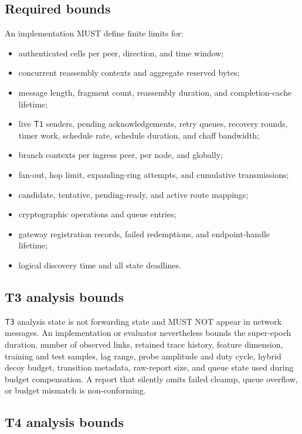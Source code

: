 \documentclass[11pt,oneside]{article}
\newcommand{\Tone}{\ensuremath{\mathsf{T1}}}
\newcommand{\Tthree}{\ensuremath{\mathsf{T3}}}
\begin{document}
\subsection{Required bounds}

An implementation MUST define finite limits for:

\begin{itemize}
  \item authenticated cells per peer, direction, and time window;
  \item concurrent reassembly contexts and aggregate reserved bytes;
  \item message length, fragment count, reassembly duration, and completion-cache lifetime;
  \item live \Tone{} senders, pending acknowledgements, retry queues, recovery rounds, timer work, schedule rate, schedule duration, and chaff bandwidth;
  \item branch contexts per ingress peer, per node, and globally;
  \item fan-out, hop limit, expanding-ring attempts, and cumulative transmissions;
  \item candidate, tentative, pending-ready, and active route mappings;
  \item cryptographic operations and queue entries;
  \item gateway registration records, failed redemptions, and endpoint-handle lifetime;
  \item logical discovery time and all state deadlines.
\end{itemize}

\subsection{T3 analysis bounds}

\Tthree{} analysis state is not forwarding state and MUST NOT appear in network messages. An implementation or evaluator nevertheless bounds the super-epoch duration, number of observed links, retained trace history, feature dimension, training and test samples, lag range, probe amplitude and duty cycle, hybrid decoy budget, transition metadata, raw-report size, and queue state used during budget compensation. A report that silently omits failed cleanup, queue overflow, or budget mismatch is non-conforming.

\subsection{T4 analysis bounds}
\end{document}
